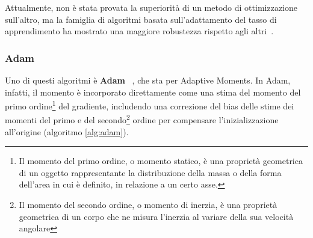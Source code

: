 \documentclass[12pt,a4paper]{report}
\begin{document}
    Attualmente, non \`e stata provata la 
    superiorit\`a di un metodo di ottimizzazione sull'altro, ma la 
    famiglia di algoritmi basata sull'adattamento del tasso di 
    apprendimento ha mostrato una maggiore robustezza rispetto agli 
    altri~\cite{schaul-et-al-2013}. 
    
    \subsubsection{Adam} \label{adam}
    Uno di questi algoritmi \`e \textbf{Adam} ~\cite{kingma2014adam}, 
    che sta per Adaptive Moments. In Adam, infatti, il momento \`e 
    incorporato direttamente come una stima del momento del primo 
    ordine\footnote{Il momento del primo ordine, o momento statico, 
    \`e una propriet\`a geometrica di un oggetto rappresentante la 
    distribuzione della massa o della forma dell'area in cui \`e 
    definito, in relazione a un certo asse.} del gradiente, includendo 
    una correzione del bias delle stime dei momenti del primo e del 
    secondo\footnote{Il momento del secondo ordine, o momento di inerzia, 
    \`e una propriet\`a geometrica di un corpo che ne misura l'inerzia 
    al variare della sua velocit\`a angolare} ordine per compensare 
    l'inizializzazione all'origine (algoritmo \ref{alg:adam}).
\end{document}
